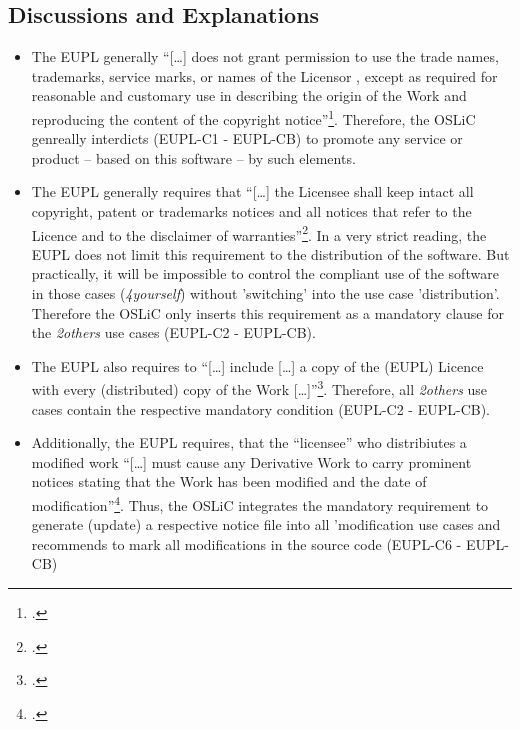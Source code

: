 \subsection{Discussions and Explanations}
\begin{itemize}
  
  \item The EUPL generally \enquote{[\ldots] does not grant permission to use
  the trade names, trademarks, service marks, or names of the Licensor , except
  as required for reasonable and customary use in describing the origin of the
  Work and reproducing the content of the copyright
  notice}\footcite[cf.][\nopage wp.\ §5]{EuplLicense2007en}. Therefore, the OSLiC
  genreally interdicts (EUPL-C1 - EUPL-CB) to promote any service or product --
  based on this software -- by such elements.

  \item The EUPL generally requires that \enquote{[\ldots] the Licensee shall
  keep intact all copyright, patent or trademarks notices and all notices that
  refer to the Licence and to the disclaimer of
  warranties}\footcite[cf.][\nopage wp.\ §5]{EuplLicense2007en}. In a very strict
  reading, the EUPL does not limit this requirement to the distribution of the
  software. But practically, it will be impossible to control the compliant use
  of the software in those cases (\emph{4yourself}) without 'switching' into the
  use case 'distribution'. Therefore the OSLiC only inserts this requirement as
  a mandatory clause for the \emph{2others} use cases (EUPL-C2 - EUPL-CB).
  
  \item The EUPL also requires to \enquote{[\ldots] include [\ldots] a copy of
  the (EUPL) Licence with every (distributed) copy of the Work
  [\ldots]}\footcite[cf.][\nopage wp.\ §5]{EuplLicense2007en}. Therefore, all
  \emph{2others} use cases contain the respective mandatory condition (EUPL-C2 -
  EUPL-CB).
  
  \item Additionally, the EUPL requires, that the \enquote{licensee} who
  distribiutes a modified work \enquote{[\ldots] must cause any Derivative Work
  to carry prominent notices stating that the Work has been modified and the
  date of modification}\footcite[cf.][\nopage wp.\ §5]{EuplLicense2007en}. Thus,
  the OSLiC integrates the mandatory requirement to generate (update) a
  respective notice file into all 'modification use cases and recommends to mark
  all modifications in the source code (EUPL-C6 - EUPL-CB)
  

\end{itemize}
